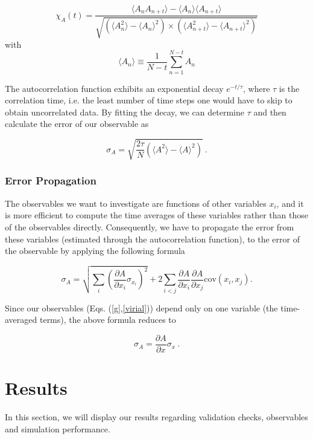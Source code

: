 \documentclass[twocolumn,10pt]{article}
\begin{document}
\begin{equation}
\chi_A(t) =
\frac{\langle A_n A_{n+t} \rangle - \langle A_n \rangle \langle A_{n+t} \rangle}
{\sqrt{ \left(  \langle A_n^2 \rangle - \langle A_n \rangle^2\right)\times \left( \langle A_{n+t}^2 \rangle - \langle A_{n+t} \rangle^2\right)}}
\end{equation}
with 
\begin{equation}
    \langle A_n \rangle \equiv \frac{1}{N-t} \sum_{n=1}^{N-t} A_n
\end{equation}

The autocorrelation function exhibits an exponential decay $e^{-t/\tau}$, where $\tau$ is the correlation time, i.e. the least number of time steps one would have to skip to obtain uncorrelated data. By fitting the decay, we can determine $\tau$ and then calculate the error of our observable as

\begin{equation}
    \sigma_A = \sqrt{\frac{2 \tau}{N} \left(\langle A^2 \rangle - \langle A \rangle^2\right)} \ .
\end{equation}



\subsubsection{Error Propagation}
The observables we want to investigate are functions of other variables $x_i$, and it is more efficient to compute the time averages of these variables rather than those of the observables directly. Consequently, we have to propagate the error from these variables (estimated through the autocorrelation function), to the error of the observable by applying the following formula

\begin{equation}
\sigma_{A} = \sqrt{\sum_i
\left( \frac{\partial A}{\partial x_i} \sigma_{x_i}\right)^2 
} + 2\sum_{i<j}\frac{\partial A}{\partial x_i}\frac{\partial A}{\partial x_j}\text{cov}(x_i,x_j)
.
\end{equation}

Since our observables (Eqs. (\ref{g},\ref{virial})) depend only on one variable (the time-averaged terms), the above formula reduces to

\begin{equation}
    \sigma_A = \frac{\partial A}{\partial x}\sigma_x \ .
\end{equation}

\section{Results}
In this section, we will display our results regarding validation checks, observables and simulation performance. 
\end{document}
